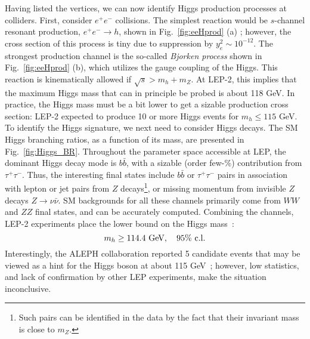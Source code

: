 \documentclass{ws-procs9x6}
\def\beq{\begin{equation}}
\def\eeq#1{\label{#1}\end{equation}}
\begin{document}
Having listed the vertices, we can now identify Higgs production processes at colliders. First, consider $e^+e^-$ collisions. The simplest reaction would be $s$-channel resonant production, $e^+e^-\to h$, shown in Fig.~\ref{fig:eeHprod} (a) ; however, the cross section of this process is tiny due to suppression by $y_e^2\sim 10^{-12}$. The strongest production channel is the so-called {\it Bjorken process} shown in Fig.~\ref{fig:eeHprod} (b), which utilizes the gauge coupling of the Higgs. This reaction is kinematically allowed if $\sqrt{s} > m_h + m_Z$. At LEP-2, this implies that the maximum Higgs mass that can in principle be probed is about 118 GeV. In practice, the Higgs mass must be a bit lower to get a sizable production cross section: LEP-2 expected to produce 10 or more Higgs events for $m_h\leq 115$ GeV. To identify the Higgs signature, we next need to 
consider Higgs decays. The SM Higgs branching ratios, as a function of its mass, are presented in Fig.~\ref{fig:Higgs_BR}. Throughout the parameter space accessible at LEP, the dominant Higgs decay mode is $b\bar{b}$, with a sizable (order few-\%) contribution from $\tau^+\tau^-$. Thus, the interesting final states include $b\bar{b}$ or $\tau^+\tau^-$ pairs in association with lepton or jet pairs from $Z$ decays\footnote{Such pairs can be identified in the data by the fact that their invariant mass is close to $m_Z$.}, or missing momentum from invisible $Z$ decays $Z\to\nu\bar{\nu}$. SM backgrounds for all these channels primarily come from $WW$ and $ZZ$ final states, and can be accurately computed. Combining the channels, LEP-2 experiments place the lower bound on the Higgs mass~\cite{PDG}:
\beq
m_h \geq 114.4~{\rm GeV,~~~95\%~c.l.}
\eeq{LEP2_hbound}    
Interestingly, the ALEPH collaboration reported 5 candidate events that may be viewed as a hint for the Higgs boson at about 115 GeV~\cite{ALEPH_Higgs}; however, low statistics, and lack of confirmation by other LEP experiments, make the situation inconclusive.
\end{document}
